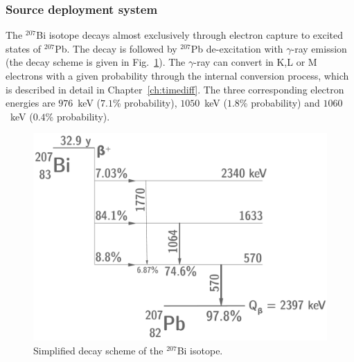 \subsubsection*{Source deployment system}

The $^{207}$Bi isotope decays almost exclusively through electron capture to excited states of $^{207}$Pb.
The decay is followed by $^{207}$Pb de-excitation with $\gamma$-ray emission (the decay scheme is given in Fig.~\ref{fig:207Bi_decay_scheme}).
The $\gamma$-ray can convert in K,L or M electrons with a given probability through the internal conversion process, which is described in detail in Chapter~\ref{ch:timediff}.
The three corresponding electron energies are $976$~keV ($7.1$\% probability), $1050$~keV ($1.8$\% probability) and $1060$~keV ($0.4$\% probability).
\begin{figure}[h!]
\centering
\includegraphics[height=0.5\textwidth]{SNdemonstrator/fig_SNdemonstrator/207Bi_decay_scheme.pdf}
\caption{Simplified decay scheme of the $^{207}$Bi isotope.
\label{fig:207Bi_decay_scheme}}
\end{figure}


